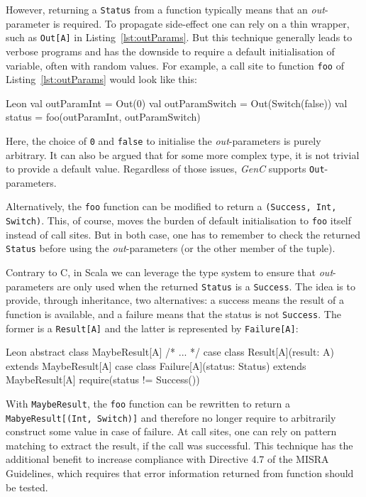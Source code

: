 \documentclass[a4paper,twoside]{article}
\newcommand{\InlineS}[1]{\lstinline[language=Leon]|#1|}
\newcommand{\GenC}{\emph{GenC}\xspace}
\newcommand{\RefCode}[1]{Listing~\ref{#1}}
\begin{document}
However, returning a \InlineS{Status} from a function typically means that an
\emph{out}-parameter is required. To propagate side-effect one can rely on a
thin wrapper, such as \InlineS{Out[A]} in \RefCode{lst:outParams}. But this
technique generally leads to verbose programs and has the downside to require a
default initialisation of variable, often with random values. For example,
a call site to function \InlineS{foo} of \RefCode{lst:outParams} would look like
this:

\pagebreak
\begin{ShortCode}{Leon}
val outParamInt = Out(0)
val outParamSwitch = Out(Switch(false))
val status = foo(outParamInt, outParamSwitch)
\end{ShortCode}

Here, the choice of \InlineS{0} and \InlineS{false} to initialise the
\emph{out}-parameters is purely arbitrary. It can also be argued that for some
more complex type, it is not trivial to provide a default value. Regardless of
those issues, \GenC supports \InlineS{Out}-parameters.

Alternatively, the \InlineS{foo} function can be modified to return a
\InlineS{(Success, Int, Switch)}. This, of course, moves the burden of default
initialisation to \InlineS{foo} itself instead of call sites. But in both case,
one has to remember to check the returned \InlineS{Status} before using the
\emph{out}-parameters (or the other member of the tuple).

Contrary to C, in Scala we can leverage the type system to ensure that
\emph{out}-parameters are only used when the returned \InlineS{Status} is a
\InlineS{Success}. The idea is to provide, through inheritance, two
alternatives: a success means the result of a function is available, and a
failure means that the status is not \InlineS{Success}. The former is a
\InlineS{Result[A]} and the latter is represented by \InlineS{Failure[A]}:
\begin{ShortCode}{Leon}
abstract class MaybeResult[A] { /* ... */ }
case class Result[A](result: A) extends MaybeResult[A]
case class Failure[A](status: Status) extends MaybeResult[A] {
  require(status != Success())
}
\end{ShortCode}

With \InlineS{MaybeResult}, the \InlineS{foo} function can be rewritten to
return a \InlineS{MabyeResult[(Int, Switch)]} and therefore no longer require to
arbitrarily construct some value in case of failure. At call sites, one can rely
on pattern matching to extract the result, if the call was successful. This
technique has the additional benefit to increase compliance with Directive 4.7
of the MISRA Guidelines, which requires that error information returned from
function should be tested.
\end{document}
